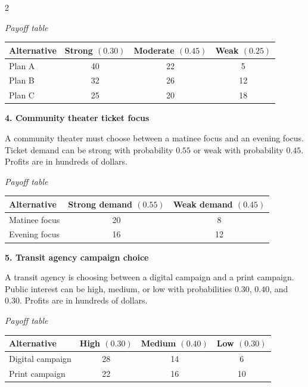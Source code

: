 \documentclass[12pt]{article}
\newcommand{\SubsectionBox}[1]{%
	\noindent\colorbox{gray!30}{%
		\parbox{\linewidth}{\textbf{#1}}%
	}\par\vspace{0.35cm}%
}
\begin{document}
\begin{multicols}{2}
		\begin{center}
			\textit{Payoff table}\\
			\begin{tabular}{|l|c|c|c|}
				\hline
				Alternative & Strong $(0.30)$ & Moderate $(0.45)$ & Weak $(0.25)$ \\
				\hline
				Plan A & 40 & 22 & 5 \\
				Plan B & 32 & 26 & 12 \\
				Plan C & 25 & 20 & 18 \\
				\hline
			\end{tabular}
		\end{center}

		\vspace{0.25cm}
		\SubsectionBox{4. Community theater ticket focus}\vspace{-0.25cm}
		A community theater must choose between a matinee focus and an evening focus. Ticket demand can be strong with probability $0.55$ or weak with probability $0.45$. Profits are in hundreds of dollars.

		\begin{center}
			\textit{Payoff table}\\
			\begin{tabular}{|l|c|c|}
				\hline
				Alternative & Strong demand $(0.55)$ & Weak demand $(0.45)$ \\
				\hline
				Matinee focus & 20 & 8 \\
				Evening focus & 16 & 12 \\
				\hline
			\end{tabular}
		\end{center}

		\vspace{0.25cm}
		\SubsectionBox{5. Transit agency campaign choice}\vspace{-0.25cm}
		A transit agency is choosing between a digital campaign and a print campaign. Public interest can be high, medium, or low with probabilities $0.30$, $0.40$, and $0.30$. Profits are in hundreds of dollars.

		\begin{center}
			\textit{Payoff table}\\
			\begin{tabular}{|l|c|c|c|}
				\hline
				Alternative & High $(0.30)$ & Medium $(0.40)$ & Low $(0.30)$ \\
				\hline
				Digital campaign & 28 & 14 & 6 \\
				Print campaign & 22 & 16 & 10 \\
				\hline
			\end{tabular}
		\end{center}

	\end{multicols}
\end{document}
